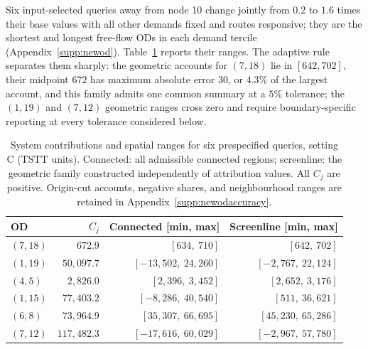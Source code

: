 Six input-selected queries away from node 10 change jointly from $0.2$ to $1.6$ times their base values with all other demands fixed and routes responsive; they are the shortest and longest free-flow ODs in each demand tercile (Appendix~\ref{supp:newod}). Table~\ref{tab:newod} reports their ranges. The adaptive rule separates them sharply: the geometric accounts for $(7,18)$ lie in $[642,702]$, their midpoint $672$ has maximum absolute error $30$, or $4.3\%$ of the largest account, and this family admits one common summary at a $5\%$ tolerance; the $(1,19)$ and $(7,12)$ geometric ranges cross zero and require boundary-specific reporting at every tolerance considered below.
\begin{table}[pos=htbp]
\footnotesize
\caption{System contributions and spatial ranges for six prespecified queries,
setting C (TSTT units). Connected: all admissible connected regions;
screenline: the geometric family constructed independently of attribution
values. All $C_j$ are positive. Origin-cut accounts, negative shares, and
neighbourhood ranges are retained in Appendix~\ref{supp:newodaccuracy}.}
\label{tab:newod}
\small
\begin{tabular*}{\tblwidth}{@{\extracolsep{\fill}}lrrr}
\toprule
OD & $C_j$ & Connected [min, max] & Screenline [min, max]\\
\midrule
$(7,18)$ & $672.9$ & $[634{,}\ 710]$ & $[642{,}\ 702]$ \\
$(1,19)$ & $50{,}097.7$ & $[-13{,}502{,}\ 24{,}260]$ & $[-2{,}767{,}\ 22{,}124]$ \\
$(4,5)$ & $2{,}826.0$ & $[2{,}396{,}\ 3{,}452]$ & $[2{,}652{,}\ 3{,}176]$ \\
$(1,15)$ & $77{,}403.2$ & $[-8{,}286{,}\ 40{,}540]$ & $[511{,}\ 36{,}621]$ \\
$(6,8)$ & $73{,}964.9$ & $[35{,}307{,}\ 66{,}695]$ & $[45{,}230{,}\ 65{,}286]$ \\
$(7,12)$ & $117{,}482.3$ & $[-17{,}616{,}\ 60{,}029]$ & $[-2{,}967{,}\ 57{,}780]$ \\
\bottomrule
\end{tabular*}
\end{table}

